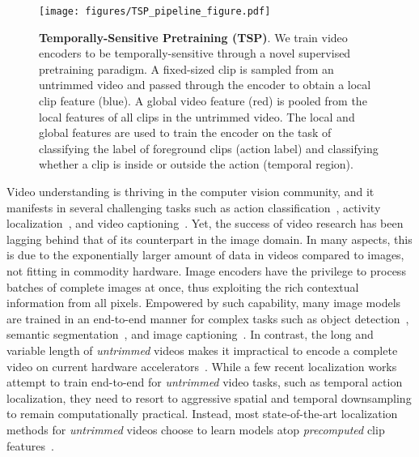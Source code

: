 \documentclass[10pt,twocolumn,letterpaper]{article}
\begin{document}
\begin{figure}[t!]
    \centering
    \texttt{[image: figures/TSP\_pipeline\_figure.pdf]}
    \vspace{-15pt}
    \caption{\textbf{Temporally-Sensitive Pretraining (TSP)}. 
    We train video encoders to be temporally-sensitive through a novel supervised pretraining paradigm. A fixed-sized clip is sampled from an untrimmed video and passed through the encoder to obtain a local clip feature (blue). A global video feature (red) is pooled from the local features of all clips in the untrimmed video. The local and global features are used to train the encoder on the task of classifying the label of foreground clips (action label) and classifying whether a clip is inside or outside the action (temporal region).}
    \vspace{-3pt}
    \label{fig:pipeline}
\end{figure}


Video understanding is thriving in the computer vision community, and it manifests in several challenging tasks such as action classification~\cite{Feichtenhofer_2019_ICCV,Korbar_2019_ICCV,Lin_2019_ICCV_TSM,Tran_2019_ICCV}, activity localization~\cite{gao_eccv_2018,kumar2017hide,zhao2020bottom}, and video captioning~\cite{Hou_2019_ICCV,Pan_2020_CVPR_Spatio,Wang_2019_ICCV,Zheng_2020_CVPR_syntax}. Yet, the success of video research has been lagging behind that of its counterpart in the image domain. In many aspects, this is due to the exponentially larger amount of data in videos compared to images, not fitting in commodity hardware. Image encoders have the privilege to process batches of complete images at once, thus exploiting the rich contextual information from all pixels. Empowered by such capability, many image models are trained in an end-to-end manner for complex tasks such as object detection~\cite{redmon2016you,ren2015faster,tan2020efficientdet}, semantic segmentation~\cite{chen2018encoder,he2017mask,howard2019searching}, and image captioning~\cite{anderson2018bottom,you2016image,lu2017knowing}. In contrast, the long and variable length of \emph{untrimmed} videos makes it impractical to encode a complete video on current hardware accelerators~\cite{wu2019long}. 
While a few recent localization works~\cite{liu2020progressive,zhao_iccv_2017} attempt to train end-to-end for \emph{untrimmed} video tasks, such as temporal action localization, they need to resort to aggressive spatial and temporal downsampling to remain computationally practical.
Instead, most state-of-the-art localization methods for \emph{untrimmed} videos choose to learn models atop \emph{precomputed} clip features~\cite{bmt,Lin_2019_ICCV,xu2020gtad,Zeng_2019_ICCV}. 
\end{document}
